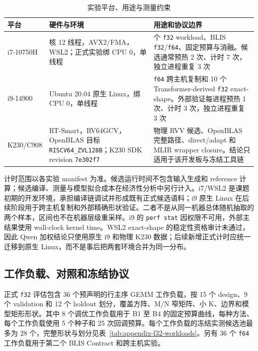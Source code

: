 \begin{table}[!htbp]
  \centering
  \caption{实验平台、用途与测量约束}
  \label{tab:chapter5-platforms}
  \begin{tabularx}{\textwidth}{
    @{}
    >{\centering\arraybackslash}p{}
    >{\raggedright\arraybackslash}p{}
    >{\raggedright\arraybackslash}X
    @{}
  }
    \toprule
    \textbf{平台} & \textbf{硬件与环境} & \textbf{用途和协议边界} \\
    \midrule
    i7-10750H &
    6 核 12 线程，AVX2/FMA，WSL2；正式实验绑 CPU 0，单线程 &
    36 个 \texttt{f32} workload、BLIS \texttt{f32}/\texttt{f64}、固定预算与消融。候选通常预热 2 次、计时 7 次，独立进程重复 3 次 \\
    i9-14900 &
    Ubuntu 20.04 原生 Linux，绑 CPU 0，单线程 &
    \texttt{f64} 跨主机复制和 10 个 Transformer-derived \texttt{f32} exact-shape。外部验证每进程预热 1 次、计时 3 次，独立进程重复 3 次 \\
    K230/C908 &
    RT-Smart，RV64GCV，OpenBLAS 目标 \texttt{RISCV64\_ZVL128B}；K230 SDK revision \texttt{7e302f7} &
    物理 RVV 候选、OpenBLAS 完整路径、direct/adapt 和 MLIR wrapper closure。结论只适用于该开发板与冻结工具链 \\
    \bottomrule
  \end{tabularx}
\end{table}

计时范围以各实验 manifest 为准。候选运行时间不包含输入生成和 reference 计算；候选编译、测量与模型拟合成本在经济性分析中另行计入。i7/WSL2 是课题初期的开发环境，承担编译链调试并形成既有正式候选语料；i9 原生 Linux 在后续阶段用于跨主机复制和外部精确形状验证。二者不是从同一机器总体随机抽取的两个样本，区间也不在机器层级重采样。i9 的 \texttt{perf stat} 因权限不可用，外部主结果使用 wall-clock kernel time。WSL2 exact-shape 的稳定性资格审计未通过，因此 Qwen 加权结论只使用原生 i9 和物理 K230 数据；后续新增正式计时应统一迁移到原生 Linux，而不是事后把两套环境合并为同一分布。

\subsection{工作负载、对照和冻结协议}

正式 \texttt{f32} 评估包含 36 个预声明的行主序 GEMM 工作负载，按 15 个 design、9 个 validation 和 12 个 holdout 划分，覆盖方阵、M/N 窄矩阵、小 K、边界和模型矩形形状。其中 8 个调优工作负载用于 B1 至 B4 的固定预算曲线，每种方法、每个工作负载使用 5 个种子和 25 次回调预算。每个工作负载的冻结实测候选池最多为 28 个，完整形状与划分见表~\ref{tab:appendix-f32-workloads}。另有 36 个 \texttt{f64} 工作负载用于第二个 BLIS Contract 和跨主机实验。

